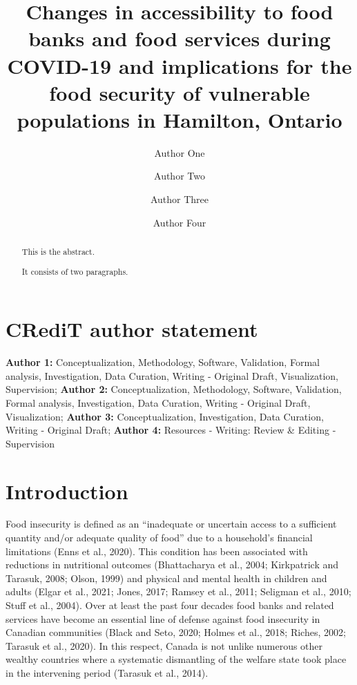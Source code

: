 \documentclass[]{elsarticle} %
\begin{document}
\begin{frontmatter}

  \title{Changes in accessibility to food banks and food services during
COVID-19 and implications for the food security of vulnerable
populations in Hamilton, Ontario}
    \author[Some University]{Author One}
    \author[]{Author Two}
    \author[Some University]{Author Three}
    \author[Another University]{Author Four}
      \address[Some University]{Department, Street, City, State, Zip}
    \address[Another University]{Department, Street, City, State, Zip}
  
  \begin{abstract}
  This is the abstract.

  It consists of two paragraphs.
  \end{abstract}
  
 \end{frontmatter}

\hypertarget{credit-author-statement}{%
\section{CRediT author statement}\label{credit-author-statement}}

\textbf{Author 1:} Conceptualization, Methodology, Software, Validation,
Formal analysis, Investigation, Data Curation, Writing - Original Draft,
Visualization, Supervision; \textbf{Author 2:} Conceptualization,
Methodology, Software, Validation, Formal analysis, Investigation, Data
Curation, Writing - Original Draft, Visualization; \textbf{Author 3:}
Conceptualization, Investigation, Data Curation, Writing - Original
Draft; \textbf{Author 4:} Resources - Writing: Review \& Editing -
Supervision

\newpage

\hypertarget{introduction}{%
\section{Introduction}\label{introduction}}

Food insecurity is defined as an ``inadequate or uncertain access to a
sufficient quantity and/or adequate quality of food'' due to a
household's financial limitations (Enns et al., 2020). This condition
has been associated with reductions in nutritional outcomes
(Bhattacharya et al., 2004; Kirkpatrick and Tarasuk, 2008; Olson, 1999)
and physical and mental health in children and adults (Elgar et al.,
2021; Jones, 2017; Ramsey et al., 2011; Seligman et al., 2010; Stuff et
al., 2004). Over at least the past four decades food banks and related
services have become an essential line of defense against food
insecurity in Canadian communities (Black and Seto, 2020; Holmes et al.,
2018; Riches, 2002; Tarasuk et al., 2020). In this respect, Canada is
not unlike numerous other wealthy countries where a systematic
dismantling of the welfare state took place in the intervening period
(Tarasuk et al., 2014).
\end{document}

